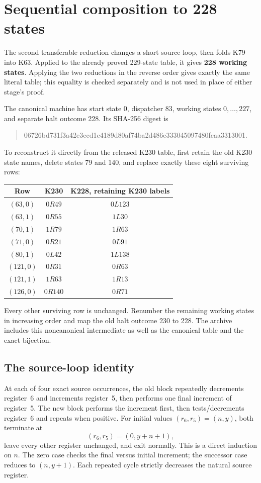 \section{Sequential composition to 228 states}
The second transferable reduction changes a short source loop, then folds
K79 into K63. Applied to the already proved 229-state table, it gives
\textbf{228 working states}. Applying the two reductions in the reverse order
gives exactly the same literal table; this equality is checked separately and
is not used in place of either stage's proof.

The canonical machine has start state 0, dispatcher 83, working states
$0,\ldots,227$, and separate halt outcome 228. Its SHA-256 digest is
\begin{quote}\ttfamily\small
06726bd731f3a42e3ccd1c4189d80af74ba2d486e333045097480fcaa3313001.
\end{quote}
To reconstruct it directly from the released K230 table, first retain the old
K230 state names, delete states 79 and 140, and replace exactly these eight
surviving rows:
\begin{center}
\begin{tabular}{ccc}
\toprule
Row & K230 & K228, retaining K230 labels\\\midrule
$(63,0)$ & $0R49$ & $0L123$\\
$(63,1)$ & $0R55$ & $1L30$\\
$(70,1)$ & $1R79$ & $1R63$\\
$(71,0)$ & $0R21$ & $0L91$\\
$(80,1)$ & $0L42$ & $1L138$\\
$(121,0)$ & $0R31$ & $0R63$\\
$(121,1)$ & $1R63$ & $1R13$\\
$(126,0)$ & $0R140$ & $0R71$\\\bottomrule
\end{tabular}
\end{center}
Every other surviving row is unchanged. Renumber the remaining working states
in increasing order and map the old halt outcome 230 to 228. The archive
includes this noncanonical intermediate as well as the canonical table and
the exact bijection.

\subsection{The source-loop identity}
At each of four exact source occurrences, the old block repeatedly decrements
register~6 and increments register~5, then performs one final increment of
register~5. The new block performs the increment first, then tests/decrements
register~6 and repeats when positive. For initial values $(r_6,r_5)=(n,y)$,
both terminate at
\[
 (r_6,r_5)=(0,y+n+1),
\]
leave every other register unchanged, and exit normally. This is a direct
induction on $n$. The zero case checks the final versus initial increment;
the successor case reduces to $(n,y+1)$. Each repeated cycle strictly decreases
the natural source register.

